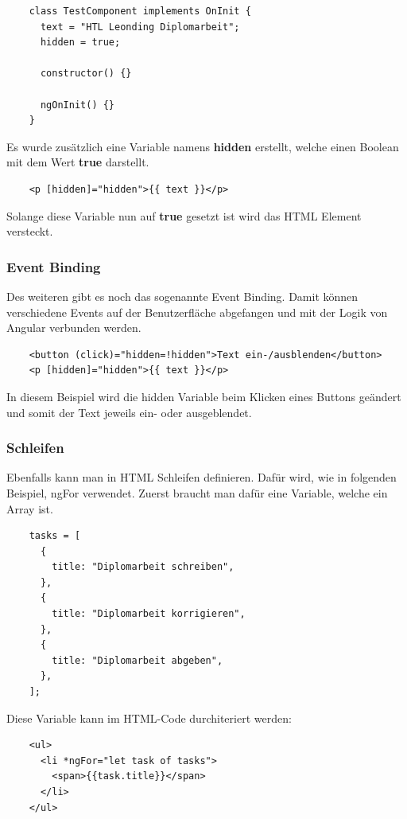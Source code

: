 \begin{lstlisting}
    class TestComponent implements OnInit {
      text = "HTL Leonding Diplomarbeit";
      hidden = true;
    
      constructor() {}
    
      ngOnInit() {}
    }
\end{lstlisting}

Es wurde zusätzlich eine Variable namens \textbf{hidden} erstellt, welche einen Boolean mit dem Wert \textbf{true} darstellt.

\begin{lstlisting}
    <p [hidden]="hidden">{{ text }}</p>
\end{lstlisting}

Solange diese Variable nun auf \textbf{true} gesetzt ist wird das HTML Element versteckt.

\subsubsection{Event Binding}
Des weiteren gibt es noch das sogenannte Event Binding. Damit können verschiedene Events auf der Benutzerfläche abgefangen und mit der Logik von Angular verbunden werden.

\begin{lstlisting}
    <button (click)="hidden=!hidden">Text ein-/ausblenden</button>
    <p [hidden]="hidden">{{ text }}</p>
\end{lstlisting}

In diesem Beispiel wird die hidden Variable beim Klicken eines Buttons geändert und somit der Text jeweils ein- oder ausgeblendet.

\subsubsection{Schleifen}
Ebenfalls kann man in HTML Schleifen definieren. Dafür wird, wie in folgenden Beispiel, ngFor verwendet.
Zuerst braucht man dafür eine Variable, welche ein Array ist.

\begin{lstlisting}
    tasks = [
      {
        title: "Diplomarbeit schreiben",
      },
      {
        title: "Diplomarbeit korrigieren",
      },
      {
        title: "Diplomarbeit abgeben",
      },
    ];
\end{lstlisting}
\newpage
Diese Variable kann im HTML-Code durchiteriert werden:

\begin{lstlisting}
    <ul>
      <li *ngFor="let task of tasks">
        <span>{{task.title}}</span>
      </li>
    </ul>
\end{lstlisting}

\cite{frontend_web_angular_introduction}


